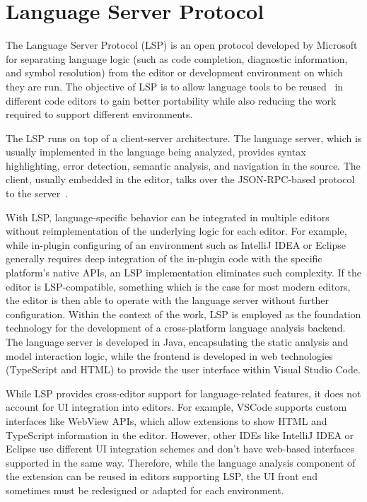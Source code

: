 {
\color{blue}
\section{Language Server Protocol} \label{sec:background_lsp}

The Language Server Protocol (LSP) is an open protocol developed by Microsoft for separating language logic (such as code completion, diagnostic information, and symbol resolution) from the editor or development environment on which they are run. The objective of LSP is to allow language tools to be reused~\cite{10.1145/3550355.3552452} in different code editors to gain better portability while also reducing the work required to support different environments.

The LSP runs on top of a client-server architecture. The language server, which is usually implemented in the language being analyzed, provides syntax highlighting, error detection, semantic analysis, and navigation in the source. The client, usually embedded in the editor, talks over the JSON-RPC-based protocol to the server~\cite{lsp}.

With LSP, language-specific behavior can be integrated in multiple editors without reimplementation of the underlying logic for each editor. For example, while in-plugin configuring of an environment such as IntelliJ IDEA or Eclipse generally requires deep integration of the in-plugin code with the specific platform’s native APIs, an LSP implementation eliminates such complexity. If the editor is LSP-compatible, something which is the case for most modern editors, the editor is then able to operate with the language server without further configuration. Within the context of the work, LSP is employed as the foundation technology for the development of a cross-platform language analysis backend. The language server is developed in Java, encapsulating the static analysis and model interaction logic, while the frontend is developed in web technologies (TypeScript and HTML) to provide the user interface within Visual Studio Code. 

While LSP provides cross-editor support for language-related features, it does not account for UI integration into editors. For example, VSCode supports custom interfaces like WebView APIs, which allow extensions to show HTML and TypeScript information in the editor. However, other IDEs like IntelliJ IDEA or Eclipse use different UI integration schemes and don't have web-based interfaces supported in the same way. Therefore, while the language analysis component of the extension can be reused in editors supporting LSP, the UI front end sometimes must be redesigned or adapted for each environment.
}

